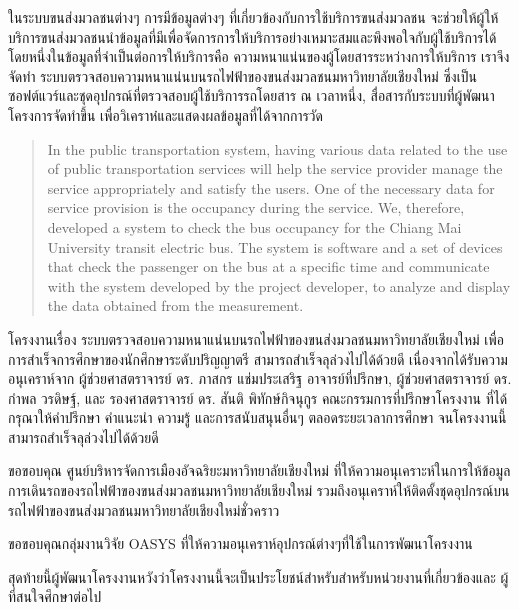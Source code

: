 \maketitle
\makesignature

\ifproject
\begin{abstractTH}
    ในระบบขนส่งมวลชนต่างๆ การมีข้อมูลต่างๆ ที่เกี่ยวข้องกับการใช้บริการขนส่งมวลชน จะช่วยให้ผู้ให้บริการขนส่งมวลชนนำข้อมูลที่มีเพื่อจัดการการให้บริการอย่างเหมาะสมและพึงพอใจกับผู้ใช้บริการได้ โดยหนึ่งในข้อมูลที่จำเป็นต่อการให้บริการคือ ความหนาแน่นของผู้โดยสารระหว่างการให้บริการ เราจึงจัดทำ ระบบตรวจสอบความหนาแน่นบนรถไฟฟ้าของขนส่งมวลชนมหาวิทยาลัยเชียงใหม่ ซึ่งเป็นซอฟต์แวร์และชุดอุปกรณ์ที่ตรวจสอบผู้ใช้บริการรถโดยสาร ณ เวลาหนึ่ง, สื่อสารกับระบบที่ผู้พัฒนาโครงการจัดทำขึ้น เพื่อวิเคราห๋และแสดงผลข้อมูลที่ได้จากการวัด
\end{abstractTH}

\begin{abstract}
    In the public transportation system, having various data related to the use of public transportation services will help the service provider manage the service appropriately and satisfy the users. One of the necessary data for service provision is the occupancy during the service. We, therefore, developed a system to check the bus occupancy for the Chiang Mai University transit electric bus. The system is software and a set of devices that check the passenger on the bus at a specific time and communicate with the system developed by the project developer, to analyze and display the data obtained from the measurement.
\end{abstract}

\iffalse
\begin{dedication}
This document is dedicated to all Chiang Mai University students.

Dedication page is optional.
\end{dedication}
\fi %

\begin{acknowledgments}
    โครงงานเรื่อง ระบบตรวจสอบความหนาแน่นบนรถไฟฟ้าของขนส่งมวลชนมหาวิทยาลัยเชียงใหม่ เพื่อการสำเร็จการศึกษาของนักศึกษาระดับปริญญาตรี สามารถสำเร็จลุล่วงไปได้ด้วยดี เนื่องจากได้รับความอนุเคราห์จาก ผู้ช่วยศาสตราจารย์ ดร. ภาสกร แช่มประเสริฐ อาจารย์ที่ปรึกษา, ผู้ช่วยศาสตราจารย์ ดร. กําพล วรดิษฐ์, และ รองศาสตราจารย์ ดร. สันติ พิทักษ์กิจนุกูร คณะกรรมการที่ปรึกษาโครงงาน ที่ได้กรุณาให้คำปรึกษา คำแนะนำ ความรู้ และการสนับสนุนอื่นๆ ตลอดระยะเวลาการศึกษา จนโครงงานนี้สามารถสำเร็จลุล่วงไปได้ด้วยดี 

    ขอขอบคุณ ศูนย์บริหารจัดการเมืองอัจฉริยะมหาวิทยาลัยเชียงใหม่ ที่ให้ความอนุเคราะห์ในการให้ข้อมูลการเดินรถของรถไฟฟ้าของขนส่งมวลชนมหาวิทยาลัยเชียงใหม่ รวมถึงอนุเคราห์ให้ติดตั้งชุดอุปกรณ์บนรถไฟฟ้าของขนส่งมวลชนมหาวิทยาลัยเชียงใหม่ชั่วคราว

    ขอขอบคุณกลุ่มงานวิจัย OASYS ที่ให้ความอนุเคราห์อุปกรณ์ต่างๆที่ใช้ในการพัฒนาโครงงาน

    สุดท้ายนี้ผู้พัฒนาโครงงานหวังว่าโครงงานนี้จะเป็นประโยชน์สำหรับสำหรับหน่วยงานที่เกี่ยวข้องและ ผู้ที่สนใจศึกษาต่อไป
\end{acknowledgments}%
\fi %

\contentspage

\ifproject
\figurelistpage

\tablelistpage
\fi %




